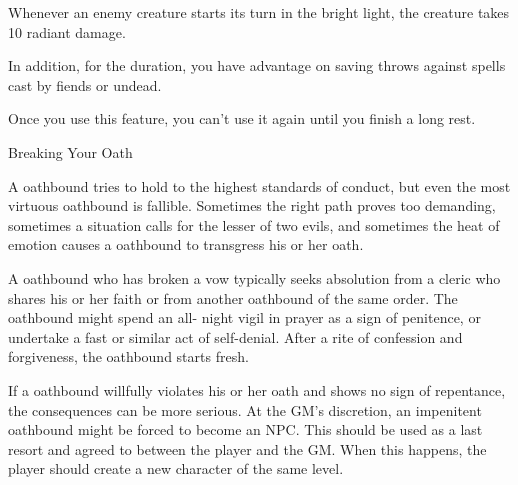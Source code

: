 Whenever an enemy creature starts its turn in the bright light, the creature takes 10 radiant damage.

In addition, for the duration, you have advantage on saving throws against spells cast by fiends or undead.

Once you use this feature, you can’t use it again until you finish a long rest.

\begin{DndComment}{Breaking Your Oath}

A oathbound tries to hold to the highest standards of conduct, but even the most virtuous oathbound is fallible. Sometimes the right path proves too demanding, sometimes a situation calls for the lesser of two evils, and sometimes the heat of emotion causes a oathbound to transgress his or her oath.

A oathbound who has broken a vow typically seeks absolution from a cleric who shares his or her faith or from another oathbound of the same order. The oathbound might spend an all- night vigil in prayer as a sign of penitence, or undertake a fast or similar act of self-denial. After a rite of confession and forgiveness, the oathbound starts fresh.

If a oathbound willfully violates his or her oath and shows no sign of repentance, the consequences can be more serious. At the GM’s discretion, an impenitent oathbound might be forced to become an NPC. This should be used as a last resort and agreed to between the player and the GM. When this happens, the player should create a new character of the same level.
\end{DndComment}

